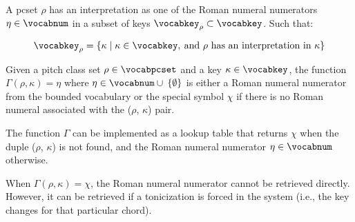
A \gls{pcset} $\rho$ has an interpretation as one of the
Roman numeral numerators $\eta \in \vocabnum$ in a subset of
keys $\vocabkey_{\rho} \subset \vocabkey$. Such that:

\begin{equation}
    \vocabkey_{\rho} = \{\kappa \mid \kappa \in \vocabkey,
     \: \text{and $\rho$ has an interpretation in $\kappa$}\}
\end{equation}



Given a pitch class set $\rho \in \vocabpcset$ and a key
$\kappa \in \vocabkey$, the function $\Gamma(\rho, \kappa) =
\eta$ where $\eta \in \vocabnum \cup \: \{ \emptyset \}$ is
either a Roman numeral numerator from the bounded vocabulary
or the special symbol $\chi$ if there is no Roman numeral
associated with the ($\rho$, $\kappa$) pair.

The function $\Gamma$ can be implemented as a lookup table
that returns $\chi$ when the duple ($\rho$, $\kappa$) is not
found, and the Roman numeral numerator $\eta \in \vocabnum$
otherwise.

When $\Gamma(\rho, \kappa) = \chi$, the Roman numeral
numerator cannot be retrieved directly. However, it can be
retrieved if a tonicization is forced in the system (i.e.,
the key changes for that particular chord).

